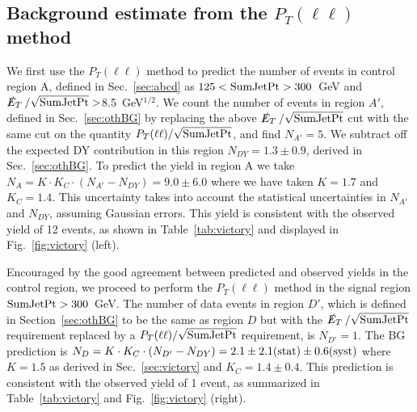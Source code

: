 \subsection{Background estimate from the $P_T(\ell\ell)$ method}
\label{sec:victoryres}

We first use the $P_T(\ell \ell)$ method to predict the number of events 
in control region A, defined in Sec.~\ref{sec:abcd} as 
$125<{\rm SumJetPt}>300$~GeV and $\met/\sqrt{\rm SumJetPt}>$8.5~GeV$^{1/2}$.
We count the number of events in region
$A'$, defined in Sec.~\ref{sec:othBG} by replacing the above $\met/\sqrt{\rm SumJetPt}$
cut with the same cut on the quantity $P_T(\ell\ell)/\sqrt{\rm SumJetPt}$,
and find $N_{A'}=5$. We subtract off the expected DY contribution in this region
$N_{DY} = 1.3 \pm 0.9$, derived in Sec.~\ref{sec:othBG}.
To predict the yield in region A we take 
$N_A = K \cdot K_C \cdot ( N_{A'} - N_{DY} ) = 9.0 \pm 6.0$
where we have taken $K = 1.7$ and $K_C = 1.4$.
This uncertainty takes into account the statistical uncertainties in $N_{A'}$ and $N_{DY}$,
assuming Gaussian errors. This yield is consistent
with the observed yield of 12 events, as shown in 
Table~\ref{tab:victory} and displayed in Fig.~\ref{fig:victory} (left).

Encouraged by the good agreement between predicted and observed yields
in the control region, we proceed to perform the $P_T(\ell \ell)$ method 
in the signal region ${\rm SumJetPt}>300$~GeV.
The number of data events in region $D'$, which is defined in 
Section~\ref{sec:othBG} to be the same as region $D$ but with the
$\met/\sqrt{\rm SumJetPt}$ requirement 
replaced by a $P_T(\ell\ell)/\sqrt{\rm SumJetPt}$ requirement,
is $N_{D'}=1$.  
The BG prediction is 
$N_D = K \cdot K_C \cdot (N_{D'}-N_{DY}) = 2.1 \pm 2.1({\rm stat}) \pm 0.6({\rm syst})$ 
where $K=1.5$ as derived in Sec.~\ref{sec:victory} and $K_C = 1.4 \pm 0.4$.
This prediction is consistent with the observed yield of 1 event, as summarized 
in Table~\ref{tab:victory} and Fig.~\ref{fig:victory} (right).



